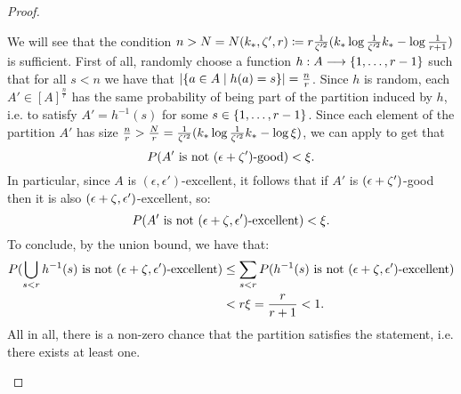 \begin{lemma}
\begin{proof}
\begin{enumerate}[label=(\alph*), ref=\alph*]
                    We will see that the condition
                    $n > N = N( k_{*}, \zeta', r ) \coloneqq r \frac{1}{\zeta'^2}( k_* \log{\frac{1}{\zeta'^2}k_*} - \log{\frac{1}{r + 1}} )$
                    is sufficient.
                    First of all, randomly choose a function $h: A \longrightarrow \{ 1, \dots, r-1 \}$ such that
                    for all $s < n$ we have that $| \{ a \in A \mid h(a) = s \} | = \frac{n}{r}$.
                    Since $h$ is random, each $A' \in [A]^\frac{n}{r}$ has the same probability of being part of the partition
                    induced by $h$, i.e. to satisfy $A' = h^{-1}(s)$ for some $s \in \{ 1, \dots, r-1 \}$.
                    Since each element of the partition $A'$ has size
                    $\frac{n}{r} > \frac{N}{r} = \frac{1}{\zeta'^2}( k_* \log{\frac{1}{\zeta'^2}k_*} - \log{\xi} )$,
                    we can apply  to get that
                    \[
                        P( A' \text{ is not } ( \epsilon + \zeta' )\text{-good} ) < \xi.
                    \]
                    In particular, since $A$ is $(\epsilon, \epsilon')$-excellent, it follows  that if $A'$ is
                    $( \epsilon + \zeta' )$-good then it is also $( \epsilon + \zeta, \epsilon' )$-excellent, so:
                    \[
                        P( A' \text{ is not } ( \epsilon + \zeta, \epsilon' )\text{-excellent} ) < \xi.
                    \]
                    To conclude, by the union bound, we have that:
                    \begin{align*}
                        P( \bigcup_{s < r} h^{-1}(s) \text{ is not } ( \epsilon + \zeta, \epsilon' )\text{-excellent} )
                            & \leq \sum_{s < r} P( h^{-1}(s) \text{ is not } ( \epsilon + \zeta, \epsilon' )\text{-excellent} ) \\
                            & < r \xi = \frac{r}{r+1} < 1.
                    \end{align*}
                    All in all, there is a non-zero chance that the partition satisfies the statement, i.e. there exists at least one.
            \end{enumerate}
            \end{proof}
        \end{lemma}

